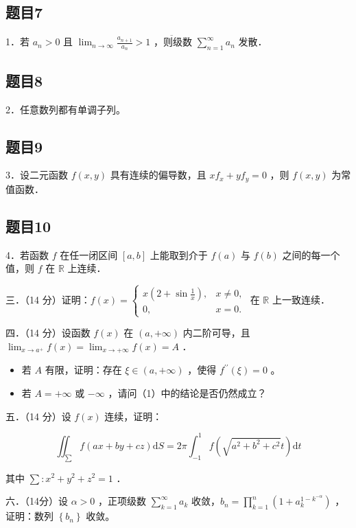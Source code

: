 \documentclass{article}
\begin{document}
\subsection{题目7}
1．若 \(a_{n}>0\) 且 \(\overline{\lim _{n \rightarrow \infty} \frac{a_{n+1}}{a_{n}}>1 \text { ，则级数 } \sum_{n=1}^{\infty} a_{n} \text { 发散．}}\)

\subsection{题目8}
2．任意数列都有单调子列。

\subsection{题目9}
3．设二元函数 \(f(x, y)\) 具有连续的偏导数，且 \(x f_{x}+y f_{y}=0\) ，则 \(f(x, y)\) 为常值函数．

\subsection{题目10}
4．若函数 \(f\) 在任一闭区间 \([a, b]\) 上能取到介于 \(f(a)\) 与 \(f(b)\) 之间的每一个值，则 \(f\) 在 \(\mathbb{R}\) 上连续．

三．（14 分）证明：\(f(x)=\left\{\begin{array}{ll}x\left(2+\sin \frac{1}{x}\right), & x \neq 0, \\ 0, & x=0 .\end{array}\right.\) 在 \(\mathbb{R}\) 上一致连续．

四．（14 分）设函数 \(f(x)\) 在 \((a,+\infty)\) 内二阶可导，且 \(\lim _{x \rightarrow a^{+}} f(x)=\lim _{x \rightarrow+\infty} f(x)=A\) ．

\begin{itemize}
  \item[（1）] 若 \(A\) 有限，证明：存在 \(\xi \in(a,+\infty)\) ，使得 \(f^{\prime \prime}(\xi)=0\) 。
  \item[（2）] 若 \(A=+\infty\) 或 \(-\infty\) ，请问（1）中的结论是否仍然成立？
\end{itemize}

五．（14 分）设 \(f(x)\) 连续，证明：

\[
\iint_{\sum} f(a x+b y+c z) \mathrm{d} S=2 \pi \int_{-1}^{1} f\left(\sqrt{a^{2}+b^{2}+c^{2}} t\right) \mathrm{d} t
\]

其中 \(\sum: x^{2}+y^{2}+z^{2}=1\) ．

六．（14分）设 \(\alpha>0\) ，正项级数 \(\sum_{k=1}^{\infty} a_{k}\) 收敛，\(b_{n}=\prod_{k=1}^{n}\left(1+a_{k}^{1-k^{-\alpha}}\right)\) ，证明：数列 \(\left\{b_{n}\right\}\) 收敛。
\end{document}
